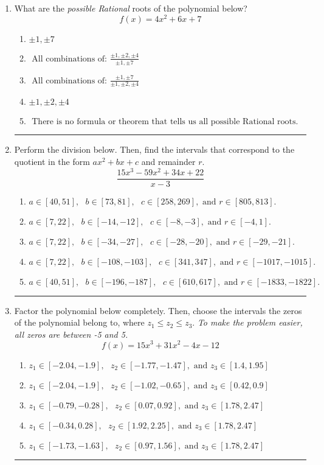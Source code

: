 \documentclass[14pt]{extbook}
\newcommand{\litem}[1]{\item#1\hspace*{-1cm}\rule{\textwidth}{0.4pt}}
\begin{document}
\begin{enumerate}
\litem{
What are the \textit{possible Rational} roots of the polynomial below?\[ f(x) = 4x^{2} +6 x + 7 \]\begin{enumerate}[label=\Alph*.]
\item \( \pm 1,\pm 7 \)
\item \( \text{ All combinations of: }\frac{\pm 1,\pm 2,\pm 4}{\pm 1,\pm 7} \)
\item \( \text{ All combinations of: }\frac{\pm 1,\pm 7}{\pm 1,\pm 2,\pm 4} \)
\item \( \pm 1,\pm 2,\pm 4 \)
\item \( \text{ There is no formula or theorem that tells us all possible Rational roots.} \)

\end{enumerate} }
\litem{
Perform the division below. Then, find the intervals that correspond to the quotient in the form $ax^2+bx+c$ and remainder $r$.\[ \frac{15x^{3} -59 x^{2} +34 x + 22}{x -3} \]\begin{enumerate}[label=\Alph*.]
\item \( a \in [40, 51], \text{   } b \in [73, 81], \text{   } c \in [258, 269], \text{   and   } r \in [805, 813]. \)
\item \( a \in [7, 22], \text{   } b \in [-14, -12], \text{   } c \in [-8, -3], \text{   and   } r \in [-4, 1]. \)
\item \( a \in [7, 22], \text{   } b \in [-34, -27], \text{   } c \in [-28, -20], \text{   and   } r \in [-29, -21]. \)
\item \( a \in [7, 22], \text{   } b \in [-108, -103], \text{   } c \in [341, 347], \text{   and   } r \in [-1017, -1015]. \)
\item \( a \in [40, 51], \text{   } b \in [-196, -187], \text{   } c \in [610, 617], \text{   and   } r \in [-1833, -1822]. \)

\end{enumerate} }
\litem{
Factor the polynomial below completely. Then, choose the intervals the zeros of the polynomial belong to, where $z_1 \leq z_2 \leq z_3$. \textit{To make the problem easier, all zeros are between -5 and 5.}\[ f(x) = 15x^{3} +31 x^{2} -4 x -12 \]\begin{enumerate}[label=\Alph*.]
\item \( z_1 \in [-2.04, -1.9], \text{   }  z_2 \in [-1.77, -1.47], \text{   and   } z_3 \in [1.4, 1.95] \)
\item \( z_1 \in [-2.04, -1.9], \text{   }  z_2 \in [-1.02, -0.65], \text{   and   } z_3 \in [0.42, 0.9] \)
\item \( z_1 \in [-0.79, -0.28], \text{   }  z_2 \in [0.07, 0.92], \text{   and   } z_3 \in [1.78, 2.47] \)
\item \( z_1 \in [-0.34, 0.28], \text{   }  z_2 \in [1.92, 2.25], \text{   and   } z_3 \in [1.78, 2.47] \)
\item \( z_1 \in [-1.73, -1.63], \text{   }  z_2 \in [0.97, 1.56], \text{   and   } z_3 \in [1.78, 2.47] \)


\end{enumerate}}
\end{enumerate}
\end{document}
